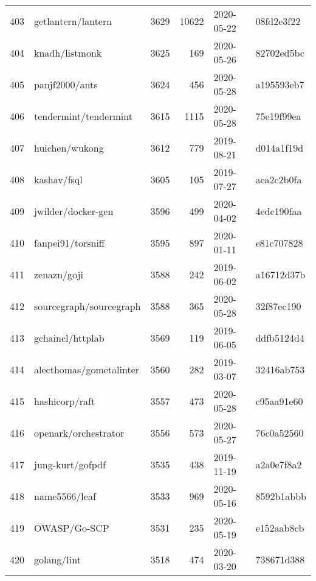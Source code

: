 \begin{longtable}{llrrll}
    403 &                                 getlantern/lantern &   3629 &  10622 & 2020-05-22 &  08fd2e3f22 \\
    404 &                                     knadh/listmonk &   3625 &    169 & 2020-05-26 &  82702ed5bc \\
    405 &                                     panjf2000/ants &   3624 &    456 & 2020-05-28 &  a195593eb7 \\
    406 &                              tendermint/tendermint &   3615 &   1115 & 2020-05-28 &  75e19f99ea \\
    407 &                                     huichen/wukong &   3612 &    779 & 2019-08-21 &  d014a1f19d \\
    408 &                                        kashav/fsql &   3605 &    105 & 2019-07-27 &  aea2c2b0fa \\
    409 &                                 jwilder/docker-gen &   3596 &    499 & 2020-04-02 &  4edc190faa \\
    410 &                                  fanpei91/torsniff &   3595 &    897 & 2020-01-11 &  e81c707828 \\
    411 &                                        zenazn/goji &   3588 &    242 & 2019-06-02 &  a16712d37b \\
    412 &                            sourcegraph/sourcegraph &   3588 &    365 & 2020-05-28 &  32f87ec190 \\
    413 &                                   gchaincl/httplab &   3569 &    119 & 2019-06-05 &  ddfb5124d4 \\
    414 &                            alecthomas/gometalinter &   3560 &    282 & 2019-03-07 &  32416ab753 \\
    415 &                                     hashicorp/raft &   3557 &    473 & 2020-05-28 &  c95aa91e60 \\
    416 &                               openark/orchestrator &   3556 &    573 & 2020-05-27 &  76c0a52560 \\
    417 &                                   jung-kurt/gofpdf &   3535 &    438 & 2019-11-19 &  a2a0e7f8a2 \\
    418 &                                      name5566/leaf &   3533 &    969 & 2020-05-16 &  8592b1abbb \\
    419 &                                       OWASP/Go-SCP &   3531 &    235 & 2020-05-19 &  e152aab8cb \\
    420 &                                        golang/lint &   3518 &    474 & 2020-03-20 &  738671d388 \\

\end{longtable}
